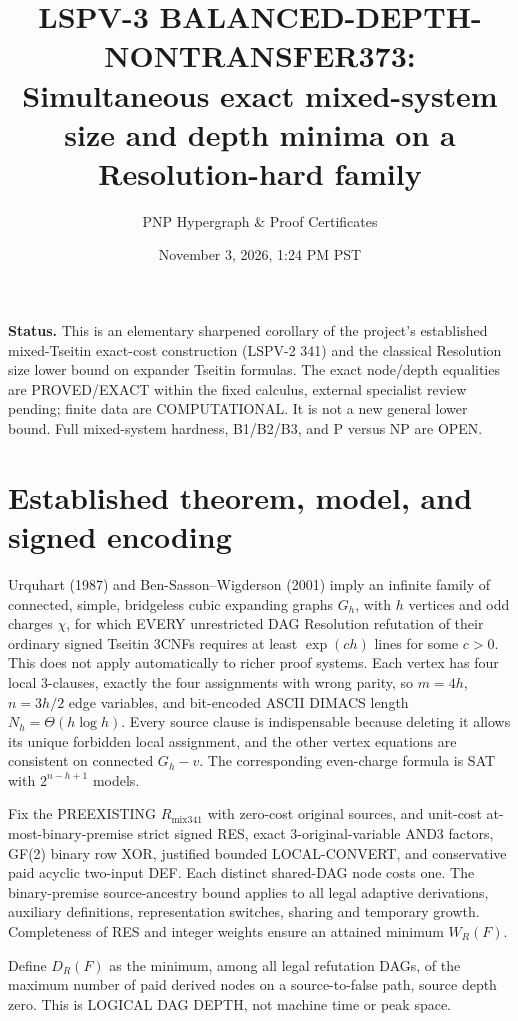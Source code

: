 \documentclass[11pt]{article}
\title{LSPV-3 BALANCED-DEPTH-NONTRANSFER373:\\
Simultaneous exact mixed-system size and depth minima on a Resolution-hard family}
\author{PNP Hypergraph \& Proof Certificates}
\date{November 3, 2026, 1:24 PM PST}
\begin{document}
\maketitle
\noindent\textbf{Status.} This is an elementary sharpened corollary of the project's established mixed-Tseitin exact-cost construction (LSPV-2 341) and the classical Resolution size lower bound on expander Tseitin formulas. The exact node/depth equalities are PROVED/EXACT within the fixed calculus, external specialist review pending; finite data are COMPUTATIONAL. It is not a new general lower bound. Full mixed-system hardness, B1/B2/B3, and P versus NP are OPEN.

\section*{Established theorem, model, and signed encoding}
Urquhart (1987) and Ben-Sasson--Wigderson (2001) imply an infinite family of connected, simple, bridgeless cubic expanding graphs \(G_h\), with \(h\) vertices and odd charges \(\chi\), for which EVERY unrestricted DAG Resolution refutation of their ordinary signed Tseitin 3CNFs requires at least \(\exp(c h)\) lines for some \(c>0\). This does not apply automatically to richer proof systems. Each vertex has four local 3-clauses, exactly the four assignments with wrong parity, so \(m=4h\), \(n=3h/2\) edge variables, and bit-encoded ASCII DIMACS length \(N_h=\Theta(h\log h)\). Every source clause is indispensable because deleting it allows its unique forbidden local assignment, and the other vertex equations are consistent on connected \(G_h-v\). The corresponding even-charge formula is SAT with \(2^{n-h+1}\) models.

Fix the PREEXISTING \(R_{\mathrm{mix341}}\) with zero-cost original sources, and unit-cost at-most-binary-premise strict signed RES, exact 3-original-variable AND3 factors, GF(2) binary row XOR, justified bounded LOCAL-CONVERT, and conservative paid acyclic two-input DEF. Each distinct shared-DAG node costs one. The binary-premise source-ancestry bound applies to all legal adaptive derivations, auxiliary definitions, representation switches, sharing and temporary growth. Completeness of RES and integer weights ensure an attained minimum \(W_R(F)\).

Define \(D_R(F)\) as the minimum, among all legal refutation DAGs, of the maximum number of paid derived nodes on a source-to-false path, source depth zero. This is LOGICAL DAG DEPTH, not machine time or peak space.
\end{document}
